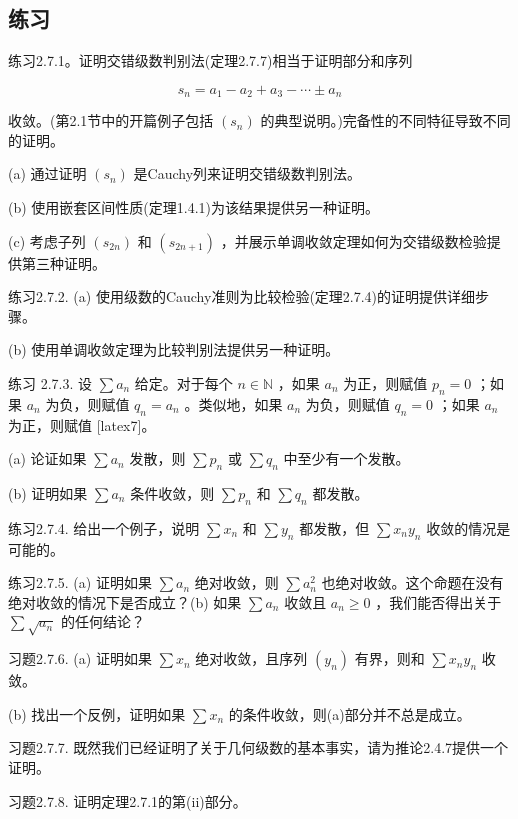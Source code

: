 \subsection{练习}

练习2.7.1。证明交错级数判别法(定理2.7.7)相当于证明部分和序列

\[
{s}_{n} = {a}_{1} - {a}_{2} + {a}_{3} - \cdots  \pm  {a}_{n}
\]

收敛。(第2.1节中的开篇例子包括 \(\left( {s}_{n}\right)\) 的典型说明。)完备性的不同特征导致不同的证明。

(a) 通过证明 \(\left( {s}_{n}\right)\) 是Cauchy列来证明交错级数判别法。

(b) 使用嵌套区间性质(定理1.4.1)为该结果提供另一种证明。

(c) 考虑子列 \(\left( {s}_{2n}\right)\) 和 \(\left( {s}_{{2n} + 1}\right)\) ，并展示单调收敛定理如何为交错级数检验提供第三种证明。

练习2.7.2. (a) 使用级数的Cauchy准则为比较检验(定理2.7.4)的证明提供详细步骤。

(b) 使用单调收敛定理为比较判别法提供另一种证明。

练习 2.7.3. 设 \(\sum {a}_{n}\) 给定。对于每个 \(n \in  \mathbb{N}\) ，如果 \({a}_{n}\) 为正，则赋值 \({p}_{n} = 0\) ；如果 \({a}_{n}\) 为负，则赋值 \({q}_{n} = {a}_{n}\) 。类似地，如果 \({a}_{n}\) 为负，则赋值 \({q}_{n} = 0\) ；如果 \({a}_{n}\) 为正，则赋值 [latex7]。

(a) 论证如果 \(\sum {a}_{n}\) 发散，则 \(\sum {p}_{n}\) 或 \(\sum {q}_{n}\) 中至少有一个发散。

(b) 证明如果 \(\sum {a}_{n}\) 条件收敛，则 \(\sum {p}_{n}\) 和 \(\sum {q}_{n}\) 都发散。

练习2.7.4. 给出一个例子，说明 \(\sum {x}_{n}\) 和 \(\sum {y}_{n}\) 都发散，但 \(\sum {x}_{n}{y}_{n}\) 收敛的情况是可能的。

练习2.7.5. (a) 证明如果 \(\sum {a}_{n}\) 绝对收敛，则 \(\sum {a}_{n}^{2}\) 也绝对收敛。这个命题在没有绝对收敛的情况下是否成立？(b) 如果 \(\sum {a}_{n}\) 收敛且 \({a}_{n} \geq  0\) ，我们能否得出关于 \(\sum \sqrt{{a}_{n}}\) 的任何结论？

习题2.7.6. (a) 证明如果 \(\sum {x}_{n}\) 绝对收敛，且序列 \(\left( {y}_{n}\right)\) 有界，则和 \(\sum {x}_{n}{y}_{n}\) 收敛。

(b) 找出一个反例，证明如果 \(\sum {x}_{n}\) 的条件收敛，则(a)部分并不总是成立。

习题2.7.7. 既然我们已经证明了关于几何级数的基本事实，请为推论2.4.7提供一个证明。

习题2.7.8. 证明定理2.7.1的第(ii)部分。

